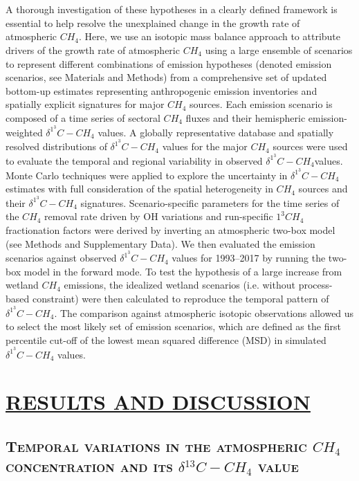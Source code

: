 \documentclass[a4paper,12pt]{article}
\begin{document}
\\\\
\small{A thorough investigation of these hypotheses in a clearly defined framework is essential to help resolve the unexplained change in the growth rate of atmospheric $CH_{4}$. Here, we use an isotopic mass balance approach to attribute drivers of the growth rate of atmospheric $CH_{4}$ using a large ensemble of scenarios to represent different combinations of emission hypotheses (denoted emission scenarios, see Materials and Methods) from a comprehensive set of updated bottom-up estimates representing anthropogenic emission inventories and spatially explicit signatures for major $CH_{4}$ sources. Each emission scenario is composed of a time series of sectoral $CH_{4}$ fluxes and their hemispheric emission-weighted $\delta ^1^3C-CH_{4}$ values. A globally representative database and spatially resolved distributions of $\delta ^1^3C-CH_{4}$ values for the major $CH_{4}$ sources were used to evaluate the temporal and regional variability in observed $\delta ^1^3C-CH_{4}$values. Monte Carlo techniques were applied to explore the uncertainty in $\delta ^1^3C-CH_{4}$ estimates with full consideration of the spatial heterogeneity in $CH_{4}$ sources and their $\delta ^1^3C-CH_{4}$ signatures. Scenario-specific parameters for the time series of the $CH_{4}$ removal rate driven by OH variations and run-specific $1^3 CH_{4}$ fractionation factors were derived by inverting an atmospheric two-box model (see Methods and Supplementary Data). We then evaluated the emission scenarios against observed $\delta ^1^3C-CH_{4}$ values for 1993–2017 by running the two-box model in the forward mode. To test the hypothesis of a large increase from wetland $CH_{4}$ emissions, the idealized wetland scenarios (i.e. without process-based constraint) were then calculated to reproduce the temporal pattern of $\delta ^1^3C-CH_{4}$. The comparison against atmospheric isotopic observations allowed us to select the most likely set of emission scenarios, which are defined as the first percentile cut-off of the lowest mean squared difference (MSD) in simulated $\delta ^1^3C-CH_{4}$ values.}


\section*{\textbf{\textsc{\Large{\underline{RESULTS AND DISCUSSION}}}}}


\subsection*{\textbf{\textsc{\large{Temporal variations in the atmospheric $CH_{4}$ concentration and its $\delta^{13}$$C-CH_{4}$ value}}}}\\
\end{document}
